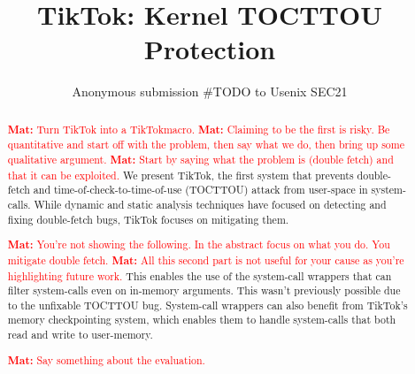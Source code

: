 \usepackage{listings}
\usepackage{parcolumns}
\usepackage{graphicx}
\usepackage{caption}
\usepackage{subcaption}
\usepackage{cleveref}

\newcommand{\pra}[1]{\textcolor{blue}{\textbf{PS:} #1}}
\newcommand{\nb}[1]{\textcolor{green}{\textbf{NB}: #1}}
\newcommand{\mat}[1]{\textcolor{red}{\textbf{Mat:} #1}}

\newcommand{\sysname}{TikTok}




\date{}

\title{\Large \bf TikTok: Kernel TOCTTOU Protection}

\author{
Anonymous submission \#TODO to Usenix SEC21
} %

\maketitle

\begin{abstract}
\mat{Turn TikTok into a \sysname macro.}
\mat{Claiming to be the first is risky. Be quantitative and start off with the
problem, then say what we do, then bring up some qualitative argument.}
\mat{Start by saying what the problem is (double fetch) and that it can be
exploited.}
We present TikTok, the first system that prevents double-fetch and
time-of-check-to-time-of-use (TOCTTOU) attack from user-space in system-calls. While dynamic and
static analysis techniques have focused on detecting and fixing double-fetch
bugs, TikTok focuses on mitigating them. 

\mat{You're not showing the following. In the abstract focus on what you do. You
mitigate double fetch.}
\mat{All this second part is not useful for your cause as you're highlighting
future work.}
This enables the use of the system-call
wrappers that can filter system-calls even on in-memory arguments. This wasn't
previously possible due to the unfixable TOCTTOU bug. System-call wrappers can
also benefit from TikTok's memory checkpointing system, which enables them to handle
system-calls that both read and write to user-memory.

\mat{Say something about the evaluation.}

\end{abstract}
